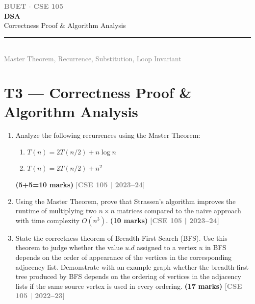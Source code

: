 \documentclass[12pt,a3paper]{article}
\newcommand{\yr}[1]{\hfill\textcolor{gray}{\small\textbf{[#1]}}}
\newcommand{\mk}[1]{\textcolor{orange!70!black}{\small\textbf{(#1 marks)}}}
\newcommand{\secdivider}[4]{%
  \newpage\thispagestyle{empty}%
  \vspace*{\fill}%
  \begin{tcolorbox}[enhanced,colback=#4!7,colframe=#3,boxrule=1.5pt,arc=8pt,
    left=20pt,right=20pt,top=22pt,bottom=22pt,
    shadow={3pt}{-3pt}{0pt}{black!15}]
    \centering
    {\large\textcolor{gray}{\textbf{BUET $\cdot$ CSE 105}}}\\[8pt]
    {\fontsize{26}{32}\selectfont\bfseries\textcolor{#3}{DSA}}\\[6pt]
    {\fontsize{15}{19}\selectfont\textcolor{dgray}{#1}}\\[12pt]
    \textcolor{#3!60}{\rule{0.5\textwidth}{0.5pt}}\\[6pt]
    {\small\textcolor{gray}{#2}}
  \end{tcolorbox}%
  \vspace*{\fill}\newpage%
}
\begin{document}
\secdivider{Correctness Proof \& Algorithm Analysis}{Master Theorem, Recurrence, Substitution, Loop Invariant}{cC}{cC}
\label{sec:T3}
\section{T3 --- Correctness Proof \& Algorithm Analysis}

\begin{enumerate}
\item Analyze the following recurrences using the Master Theorem:
\begin{enumerate}
  \item $T(n) = 2T(n/2) + n\log n$
  \item $T(n) = 2T(n/2) + n^2$
\end{enumerate}
\mk{5+5=10}
\yr{CSE 105 | 2023--24}

\item Using the Master Theorem, prove that Strassen's algorithm improves the runtime of multiplying two $n \times n$ matrices compared to the naive approach with time complexity $O(n^3)$. \mk{10}
\yr{CSE 105 | 2023--24}

\item State the correctness theorem of Breadth-First Search (BFS). Use this theorem to judge whether the value $u.d$ assigned to a vertex $u$ in BFS depends on the order of appearance of the vertices in the corresponding adjacency list. Demonstrate with an example graph whether the breadth-first tree produced by BFS depends on the ordering of vertices in the adjacency lists if the same source vertex is used in every ordering. \mk{17}
\yr{CSE 105 | 2022--23}

\begin{center}


\end{center}
\end{enumerate}
\end{document}
